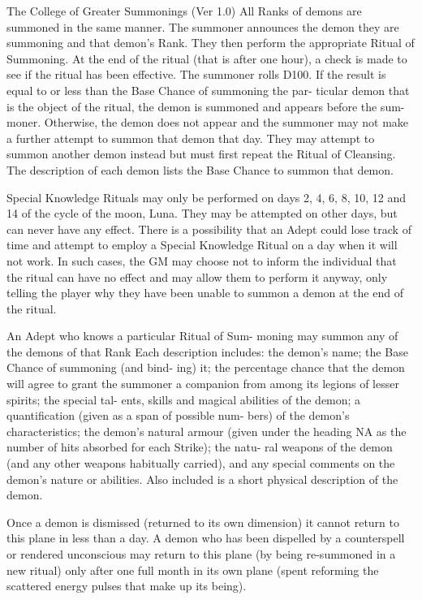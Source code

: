 \begin{Chapter}{The College of Greater Summonings (Ver 1.0)}
All  Ranks  of  demons  are  summoned  in  the  same 
manner. The summoner announces the demon they 
are summoning and that demon’s Rank. They then 
perform  the  appropriate  Ritual  of  Summoning.  At 
the end of the ritual (that is after one hour), a check 
is made to see if the ritual has been effective. The 
summoner  rolls  D100.  If  the  result  is  equal  to  or 
less  than  the  Base  Chance  of  summoning  the  par-
ticular  demon  that  is  the  object  of  the  ritual,  the 
demon  is  summoned  and  appears  before  the  sum-
moner. Otherwise, the demon does not appear and 
the  summoner  may  not  make  a  further  attempt  to 
summon that demon that day. They may attempt to 
summon  another  demon  instead  but  must  first 
repeat  the  Ritual  of  Cleansing.  The  description  of 
each demon lists the Base Chance to summon that 
demon. 

Special Knowledge Rituals may only be performed 
on days 2, 4, 6, 8, 10, 12 and 14 of the cycle of the 
moon, Luna. They may be attempted on other days, 
but can never have any effect. There is a possibility 
that an Adept could lose track of time and attempt 
to  employ  a  Special  Knowledge  Ritual  on  a  day 
when it will not work.  In such cases, the GM may 
choose  not  to  inform  the  individual  that  the  ritual 
can have no effect and may allow them to perform 
it  anyway,  only  telling  the  player  why  they  have 
been unable to summon a demon at the end of the 
ritual. 

An  Adept  who  knows  a  particular  Ritual  of  Sum-
moning  may  summon  any  of  the  demons  of  that 
Rank  Each  description  includes:  the  demon’s 
name;  the  Base  Chance  of  summoning  (and  bind-
ing)  it;  the  percentage  chance  that  the  demon  will 
agree  to  grant  the  summoner  a  companion  from 
among  its  legions  of  lesser  spirits;  the  special  tal-
ents,  skills  and  magical  abilities  of  the  demon;  a 
quantification  (given  as  a  span  of  possible  num-
bers)  of  the  demon’s  characteristics;  the  demon’s 
natural armour (given under the heading NA as the 
number of hits absorbed for each Strike); the natu-
ral weapons of the demon (and any other weapons 
habitually  carried),  and  any  special  comments  on 
the  demon’s  nature  or  abilities.  Also  included  is  a 
short physical description of the demon. 

Once  a  demon  is  dismissed  (returned  to  its  own 
dimension)  it  cannot  return  to  this  plane  in  less 
than a day.  A demon  who has been  dispelled by a 
counterspell or rendered unconscious may return to 
this plane (by being re-summoned in a new ritual) 
only  after  one  full  month  in  its  own  plane  (spent 
reforming the scattered energy pulses that make up 
its being). 


\end{Chapter}
